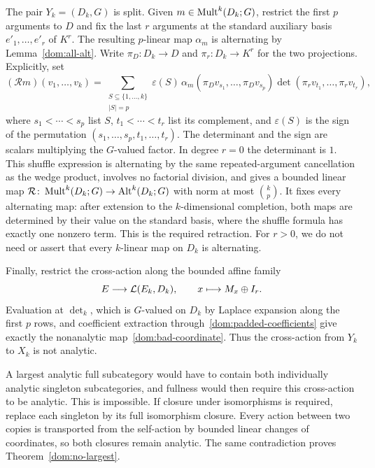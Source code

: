 The pair $Y_k=(D_k,G)$ is split. Given $m\in\operatorname{Mult}^k(D_k;G)$, restrict the first $p$ arguments to
$D$ and fix the last $r$ arguments at the standard auxiliary basis $e'_1,\ldots,e'_r$ of $K^r$.
The resulting $p$-linear map $\alpha_m$ is alternating by Lemma~\ref{dom:all-alt}. Write
$\pi_D\colon D_k\to D$ and $\pi_r\colon D_k\to K^r$ for the two projections. Explicitly, set
\[
 (\mathcal Rm)(v_1,\ldots,v_k)=
 \sum_{\substack{S\subseteq\{1,\ldots,k\}\\|S|=p}}
 \varepsilon(S)\,
 \alpha_m(\pi_Dv_{s_1},\ldots,\pi_Dv_{s_p})
 \det(\pi_rv_{t_1},\ldots,\pi_rv_{t_r}),
\]
where $s_1<\cdots<s_p$ list $S$, $t_1<\cdots<t_r$ list its complement, and $\varepsilon(S)$
is the sign of the permutation $(s_1,\ldots,s_p,t_1,\ldots,t_r)$. The determinant and the sign
are scalars multiplying the $G$-valued factor. In degree $r=0$ the determinant is $1$.
This shuffle expression is alternating by the same repeated-argument cancellation as the wedge
product, involves no factorial division, and gives a bounded linear map
$\mathcal R\colon\operatorname{Mult}^k(D_k;G)\to\operatorname{Alt}^k(D_k;G)$ with norm at most $\binom{k}{p}$.
It fixes every alternating map: after extension to the $k$\nobreakdash-dimensional completion, both maps
are determined by their value on the standard basis, where the shuffle formula has exactly one nonzero
term. This is the required retraction. For $r>0$, we do not need or assert that every $k$\nobreakdash-linear
map on $D_k$ is alternating.

Finally, restrict the cross-action along the bounded affine family
\[
E\longrightarrow\mathcal L(E_k,D_k),\qquad x\longmapsto M_x\oplus I_r.
\]
Evaluation at $\det_k$, which is $G$\nobreakdash-valued on $D_k$ by Laplace expansion along the first $p$ rows, and coefficient extraction through~\eqref{dom:padded-coefficients} give exactly
the nonanalytic map~\eqref{dom:bad-coordinate}. Thus the cross-action from $Y_k$ to $X_k$ is not analytic.

A largest analytic full subcategory would have to contain both individually analytic singleton
subcategories, and fullness would then require this cross-action to be analytic. This is impossible.
If closure under isomorphisms is required, replace each singleton by its full isomorphism closure.
Every action between two copies is transported from the self-action by bounded linear changes of
coordinates, so both closures remain analytic. The same contradiction proves Theorem~\ref{dom:no-largest}.

